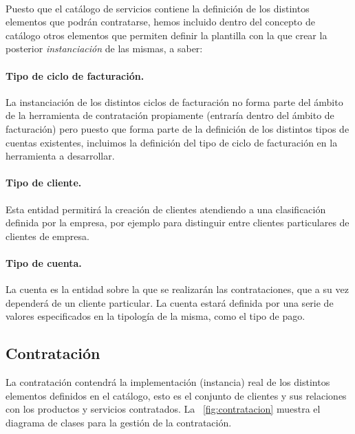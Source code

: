 \paragraph{}
Puesto que el catálogo de servicios contiene la definición de los distintos elementos que podrán contratarse, hemos incluido dentro del concepto de catálogo otros elementos que permiten definir la plantilla con la que crear la posterior \textit{instanciación} de las mismas, a saber:

\paragraph{Tipo de ciclo de facturación.} La instanciación de los distintos ciclos de facturación no forma parte del ámbito de la herramienta de contratación propiamente (entraría dentro del ámbito de facturación) pero puesto que forma parte de la definición de los distintos tipos de cuentas existentes, incluimos la definición del tipo de ciclo de facturación en la herramienta a desarrollar.

\paragraph{Tipo de cliente.} Esta entidad permitirá la creación de clientes atendiendo a una clasificación definida por la empresa, por ejemplo para distinguir entre clientes particulares de clientes de empresa.

\paragraph{Tipo de cuenta.} La cuenta es la entidad sobre la que se realizarán las contrataciones, que a su vez dependerá de un cliente particular. La cuenta estará definida por una serie de valores especificados en la tipología de la misma, como el tipo de pago.



\subsection{Contratación}
\label{sub:contratacion}
La contratación contendrá la implementación (instancia) real de los distintos elementos definidos en el catálogo, esto es el conjunto de clientes y sus relaciones con los productos y servicios contratados. La \figurename~\ref{fig:contratacion} muestra el diagrama de clases para la gestión de la contratación.



